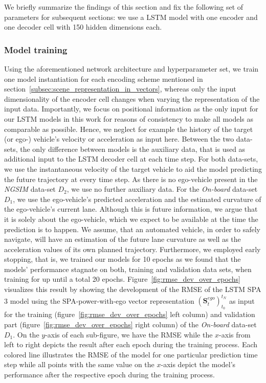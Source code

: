 We briefly summarize the findings of this section and fix the following set of parameters for subsequent sections: we use a \ac{LSTM} model with one encoder and one decoder cell with \num{150} hidden dimensions each.

\subsubsection{Model training}%
\label{ssubsec:model_training_lstms}

Using the aforementioned network architecture and hyperparameter set, we train one model instantiation for each encoding scheme mentioned in section~\ref{subsec:scene_representation_in_vectors}, whereas only the input dimensionality of the encoder cell changes when varying the representation of the input data.
Importantly, we focus on positional information as the only input for our \ac{LSTM} models in this work for reasons of consistency to make all models as comparable as possible.
Hence, we neglect for example the history of the target (or ego-) vehicle's velocity or acceleration as input here.
Between the two data-sets, the only difference between models is the auxiliary data, that is used as additional input to the \ac{LSTM} decoder cell at each time step.
For both data-sets, we use the instantaneous velocity of the target vehicle to aid the model predicting the future trajectory at every time step.
As there is no ego-vehicle present in the \emph{\ac{NGSIM}} data-set $D_2$, we use no further auxiliary data.
For the \emph{On-board} data-set $D_1$, we use the ego-vehicle's predicted acceleration and the estimated curvature of the ego-vehicle's current lane.
Although this is future information, we argue that it is solely about the ego-vehicle, which we expect to be available at the time the prediction is to happen.
We assume, that an automated vehicle, in order to safely navigate, will have an estimation of the future lane curvature as well as the acceleration values of its own planned trajectory.
Furthermore, we employed early stopping, that is, we trained our models for \num{10} epochs as we found that the models' performance stagnate on both, training and validation data sets, when training for up until a total \num{20} epochs.
Figure~\ref{fig:rmse_dev_over_epochs} visualizes this result by showing the development of the \ac{RMSE} of the \ac{LSTM} \acs{SPA} \num{3} model using the \ac{SPA}-power-with-ego vector representation $(\mathbf{S}_{t}^{ego})_{t_0}^{t_N}$ as input for the training (figure~\ref{fig:rmse_dev_over_epochs} left column) and validation part (figure~\ref{fig:rmse_dev_over_epochs} right column) of the \emph{On-board} data-set $D_1$.
On the $y$-axis of each sub-figure, we have the \ac{RMSE} while the $x$-axis from left to right depicts the result after each epoch during the training process.
Each colored line illustrates the \ac{RMSE} of the model for one particular prediction time step while all points with the same value on the $x$-axis depict the model's performance after the respective epoch during the training process.


